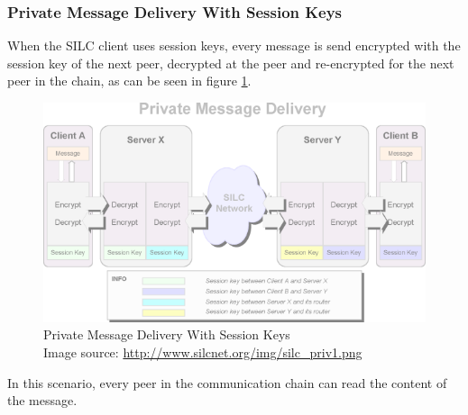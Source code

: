 \subsubsection{Private Message Delivery With Session Keys}
When the SILC client uses session keys, every message is send encrypted
with the session key of the next peer, decrypted at the peer and re-encrypted
for the next peer in the chain, as can be seen in figure \ref{silcsessionkey}.
\begin{figure}
    \centering
    \caption[Silc: Private Message Delivery With Session Keys]{Private Message Delivery With Session Keys\\Image source: \protect\url{http://www.silcnet.org/img/silc_priv1.png}}
    \label{silcsessionkey}
    \includegraphics[scale=0.8]{silc_priv1.png}
\end{figure}
In this scenario, every peer in the communication chain
can read the content of the message.
